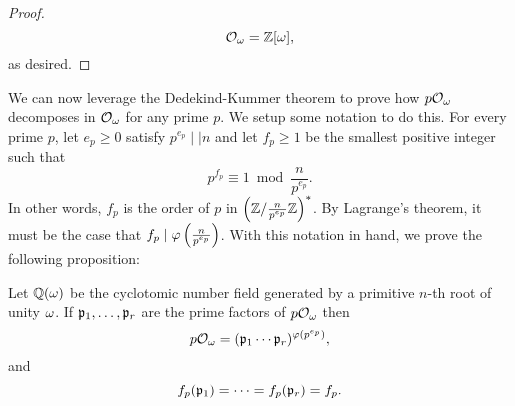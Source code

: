 \begin{proof}
      \[
        \mathcal{O}_{\omega} = \mathbb{Z}[\omega],
      \]
      as desired.
    \end{proof}

    We can now leverage the Dedekind-Kummer theorem to prove how $p\mathcal{O}_{\omega}$ decomposes in $\mathcal{O}_{\omega}$ for any prime $p$. We setup some notation to do this. For every prime $p$, let $e_{p} \ge 0$ satisfy $p^{e_{p}} \mid\mid n$ and let $f_{p} \ge 1$ be the smallest positive integer such that
    \[
      p^{f_{p}} \equiv 1 \bmod{\frac{n}{p^{e_{p}}}}.
    \]
    In other words, $f_{p}$ is the order of $p$ in $\left(\mathbb{Z}/\frac{n}{p^{e_{p}}}\mathbb{Z}\right)^{\ast}$. By Lagrange's theorem, it must be the case that $f_{p} \mid \varphi\left(\frac{n}{p^{e_{p}}}\right)$. With this notation in hand, we prove the following proposition:

    \begin{proposition}\label{prop:factorization_of_primes_cyclotomic}
      Let $\mathbb{Q}(\omega)$ be the cyclotomic number field generated by a primitive $n$-th root of unity $\omega$. If $\mathfrak{p}_{1},\ldots,\mathfrak{p}_{r}$ are the prime factors of $p\mathcal{O}_{\omega}$ then
      \[
        p\mathcal{O}_{\omega} = (\mathfrak{p}_{1} \cdots \mathfrak{p}_{r})^{\varphi(p^{e_{p}})},
      \]
      and
      \[
        f_{p}(\mathfrak{p}_{1}) = \cdots = f_{p}(\mathfrak{p}_{r}) = f_{p}.
      \]
    \end{proposition}
